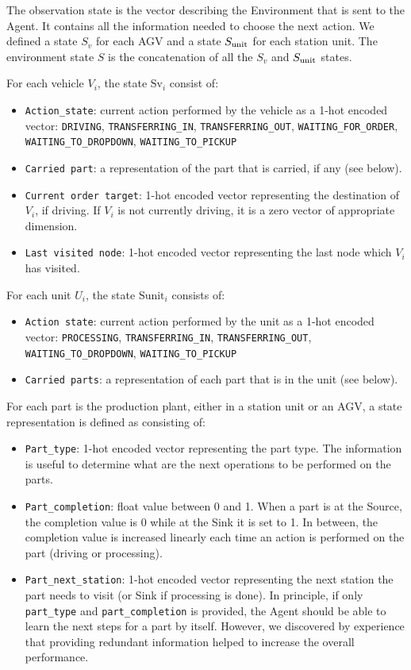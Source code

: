 \documentclass[sn-mathphys]{sn-jnl}
\begin{document}
The observation state is the vector describing the Environment that is sent to the Agent. It contains all the information needed to choose the next action. We defined a state $S_v$ for each AGV and a state $S_{\rm unit}$ for each station unit. The environment state $S$ is the concatenation of all the $S_v$ and $S_{\rm unit}$ states.

For each vehicle $V_i$, the state $\text{Sv}_i$ consist of:
\begin{itemize}
    \item \texttt{Action\_state}: current action performed by the vehicle as a 1-hot encoded vector: \texttt{DRIVING}, \texttt{TRANSFERRING\_IN}, \texttt{TRANSFERRING\_OUT}, \texttt{WAITING\_FOR\_ORDER}, \texttt{WAITING\_TO\_DROPDOWN}, \texttt{WAITING\_TO\_PICKUP}
    \item \texttt{Carried part}: a representation of the part that is carried, if any (see below).
    \item \texttt{Current order target}: 1-hot encoded vector representing the destination of $V_i$, if driving. If $V_i$ is not currently driving, it is a zero vector of appropriate dimension.
    \item \texttt{Last visited node}: 1-hot encoded vector representing the last node which $V_i$ has visited.
\end{itemize}

\noindent For each unit $U_i$, the state $\text{Sunit}_i$ consists of:
\begin{itemize}
    \item \texttt{Action state}: current action performed by the unit as a 1-hot encoded vector: \texttt{PROCESSING}, \texttt{TRANSFERRING\_IN}, \texttt{TRANSFERRING\_OUT}, \texttt{WAITING\_TO\_DROPDOWN}, \texttt{WAITING\_TO\_PICKUP}
    \item \texttt{Carried parts}: a representation of each part that is in the unit (see below).
\end{itemize}

For each part is the production plant, either in a station unit or an AGV, a state representation is defined as consisting of:
\begin{itemize}
    \item \texttt{Part\_type}: 1-hot encoded vector representing the part type. The information is useful to determine what are the next operations to be performed on the parts.
    \item \texttt{Part\_completion}: float value between 0 and 1. When a part is at the Source, the completion value is 0 while at the Sink it is set to 1. In between, the completion value is increased linearly each time an action is performed on the part (driving or processing).
    \item \texttt{Part\_next\_station}: 1-hot encoded vector representing the next station the part needs to visit (or Sink if processing is done). In principle, %
    if only \texttt{part\_type} and \texttt{part\_completion} is provided, the Agent should be able to learn the next steps for a part by itself. However, we discovered by experience that providing redundant information helped to increase the overall performance.
\end{itemize}
\end{document}
